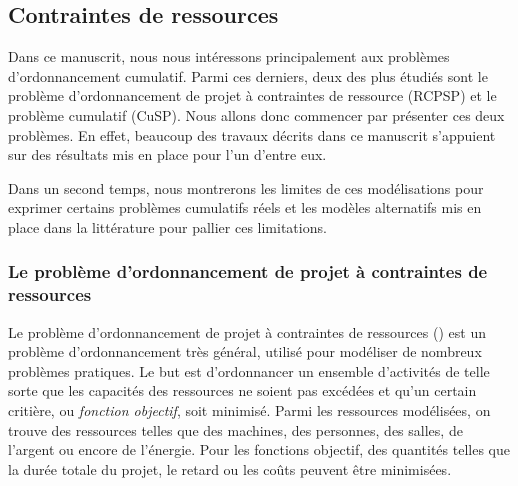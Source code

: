 
\subsection{Contraintes de ressources}
\label{sec:ordo_res}
Dans ce manuscrit, nous nous intéressons  principalement  aux problèmes
d'ordonnancement cumulatif. Parmi ces derniers, deux des plus
étudiés sont le problème d'ordonnancement de projet à contraintes de
ressource (RCPSP) et le problème cumulatif (CuSP). Nous allons donc
commencer par présenter ces deux problèmes. En effet, beaucoup des
travaux décrits dans ce manuscrit s'appuient sur des résultats mis en
place pour l'un d'entre eux. 

Dans un second temps, nous montrerons les limites de ces modélisations
pour exprimer certains problèmes cumulatifs réels et
les modèles alternatifs mis en place dans la littérature pour pallier ces
limitations.

\subsubsection{Le problème d'ordonnancement de projet à contraintes de
ressources}

Le problème d'ordonnancement de projet à contraintes de ressources
(\RCPSP) est un problème d'ordonnancement très général, utilisé pour
modéliser de nombreux problèmes pratiques. Le but est
d'ordonnancer un ensemble d'activités de telle sorte que les capacités
des ressources ne soient pas excédées et qu'un certain critière, ou
{\it  fonction objectif}, soit minimisé. Parmi les ressources
modélisées, on trouve des ressources telles que des machines, des
personnes, des salles, de l'argent ou encore de l'énergie. Pour les
fonctions objectif, des quantités telles que la durée totale du
projet, le retard ou les coûts peuvent être minimisées.


